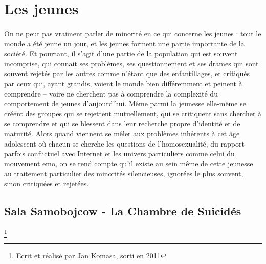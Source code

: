 \documentclass[12pt]{amsart}
\begin{document}
\clearpage
\section{Les jeunes}
\paragraph{}
On ne peut pas vraiment parler de minorité en ce qui concerne les jeunes : tout le monde a été jeune un jour, et les jeunes forment une partie importante de la société. Et pourtant, il s’agit d’une partie de la population qui est souvent incomprise, qui connait ses problèmes, ses questionnement et ses drames qui sont souvent rejetés par les autres comme n’étant que des enfantillages, et critiqués par ceux qui, ayant grandis, voient le monde bien différemment et peinent à comprendre – voire ne cherchent pas à comprendre la complexité du comportement de jeunes d’aujourd’hui. Même parmi la jeunesse elle-même se créent des groupes qui se rejettent mutuellement, qui se critiquent sans chercher à se comprendre et qui se blessent dans leur recherche propre d’identité et de maturité. Alors quand viennent se mêler aux problèmes inhérents à cet âge adolescent où chacun se cherche les questions de l’homosexualité, du rapport parfois conflictuel avec Internet et les univers particuliers comme celui du mouvement emo, on se rend compte qu’il existe au sein même de cette jeunesse au traitement particulier des minorités silencieuses, ignorées le plus souvent, sinon critiquées et rejetées.

\subsection*{Sala Samobojcow - La Chambre de Suicidés}\footnote{Ecrit et réalisé par Jan Komasa, sorti en 2011}
\end{document}
